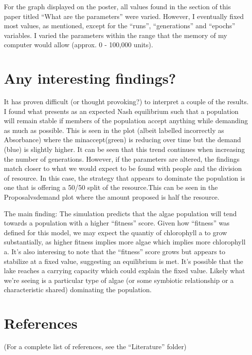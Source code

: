 \documentclass[]{article}
\begin{document}
For the graph displayed on the poster, all values found in the section
of this paper titled ``What are the parameters'' were varied. However, I
eventually fixed most values, as mentioned, except for the ``runs'',
``generations'' and ``epochs'' variables. I varied the parameters within
the range that the memory of my computer would allow (approx. 0 -
100,000 units).

\section{Any interesting findings?}\label{any-interesting-findings}

It has proven difficult (or thought provoking?) to interpret a couple of
the results. I found what presents as an expected Nash equilibrium such
that a population will remain stable if members of the population accept
anything while demanding as much as possible. This is seen in the plot
(albeit labelled incorrectly as Absorbance) where the minaccept(green)
is reducing over time but the demand (blue) is slightly higher. It can
be seen that this trend continues when increasing the number of
generations. However, if the parameters are altered, the findings match
closer to what we would expect to be found with people and the division
of resource. In this case, the strategy that appears to dominate the
population is one that is offering a 50/50 split of the resource.This
can be seen in the Proposalvsdemand plot where the amount proposed is
half the resource.

The main finding: The simulation predicts that the algae population will
tend towards a population with a higher ``fitness'' score. Given how
``fitness'' was defined for this model, we may expect the quantiy of
chlorophyll a to grow substantially, as higher fitness implies more
algae which implies more chlorophyll a. It's also interesing to note
that the ``fitness'' score grows but appears to stabilize at a fixed
value, suggesting an equilibrium is met. It's possible that the lake
reaches a carrying capacity which could explain the fixed value. Likely
what we're seeing is a particular type of algae (or some symbiotic
relationship or a characteristic shared) dominating the population.

\section{References}\label{references}

(For a complete list of references, see the ``Literature'' folder)
\end{document}
